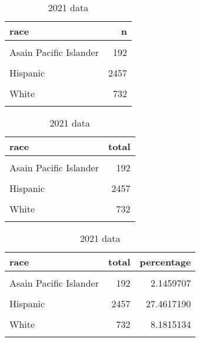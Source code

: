 \documentclass[
  letterpaper,
  DIV=11,
  numbers=noendperiod]{scrartcl}
\begin{document}
\begin{table}

\caption{2021 data}
\centering
\begin{tabular}[t]{lr}
\toprule
race & n\\
\midrule
\cellcolor{gray!6}{American Indian Alaskan Native} & \cellcolor{gray!6}{8}\\
Asain Pacific Islander & 192\\
\cellcolor{gray!6}{Black} & \cellcolor{gray!6}{5404}\\
Hispanic & 2457\\
\cellcolor{gray!6}{Middle Eastern Southwest Asain} & \cellcolor{gray!6}{71}\\
\addlinespace
White & 732\\
\cellcolor{gray!6}{NA} & \cellcolor{gray!6}{83}\\
\bottomrule
\end{tabular}
\end{table}

\newpage

\begin{table}

\caption{2021 data}
\centering
\begin{tabular}[t]{lr}
\toprule
race & total\\
\midrule
\cellcolor{gray!6}{American Indian Alaskan Native} & \cellcolor{gray!6}{8}\\
Asain Pacific Islander & 192\\
\cellcolor{gray!6}{Black} & \cellcolor{gray!6}{5404}\\
Hispanic & 2457\\
\cellcolor{gray!6}{Middle Eastern Southwest Asain} & \cellcolor{gray!6}{71}\\
\addlinespace
White & 732\\
\cellcolor{gray!6}{NA} & \cellcolor{gray!6}{83}\\
\bottomrule
\end{tabular}
\end{table}

\newpage

\begin{table}

\caption{2021 data}
\centering
\begin{tabular}[t]{lrr}
\toprule
race & total & percentage\\
\midrule
\cellcolor{gray!6}{American Indian Alaskan Native} & \cellcolor{gray!6}{8} & \cellcolor{gray!6}{0.0894154}\\
Asain Pacific Islander & 192 & 2.1459707\\
\cellcolor{gray!6}{Black} & \cellcolor{gray!6}{5404} & \cellcolor{gray!6}{60.4001341}\\
Hispanic & 2457 & 27.4617190\\
\cellcolor{gray!6}{Middle Eastern Southwest Asain} & \cellcolor{gray!6}{71} & \cellcolor{gray!6}{0.7935621}\\
\addlinespace
White & 732 & 8.1815134\\
\cellcolor{gray!6}{NA} & \cellcolor{gray!6}{83} & \cellcolor{gray!6}{0.9276853}\\
\bottomrule
\end{tabular}
\end{table}
\end{document}
